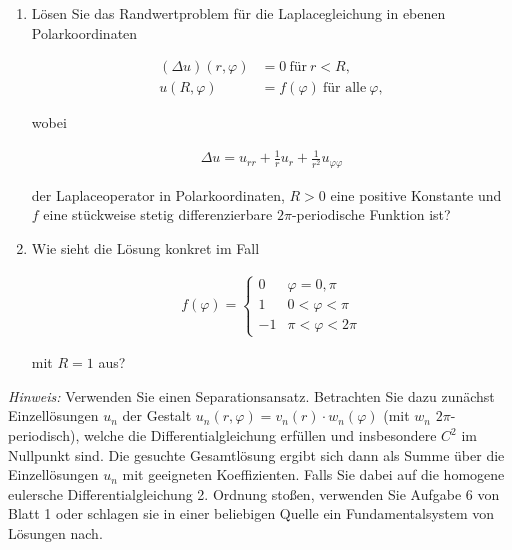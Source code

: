 
\begin{exercise}

\phantom{}

\begin{enumerate}[label = (\roman*)]

    \item Lösen Sie das Randwertproblem für die Laplacegleichung in ebenen Polarkoordinaten

    \begin{align*}
        (\Delta u)(r, \varphi)
        & =
        0 ~\text{für}~ r < R, \\
        u(R, \varphi)
        & =
        f(\varphi) ~\text{für alle}~ \varphi,
    \end{align*}

    wobei

    \begin{align*}
        \Delta u
        =
        u_{rr} + \frac{1}{r} u_r + \frac{1}{r^2} u_{\varphi \varphi}
    \end{align*}

    der Laplaceoperator in Polarkoordinaten, $R > 0$ eine positive Konstante und $f$ eine stückweise stetig differenzierbare $2 \pi$-periodische Funktion ist?

    \item Wie sieht die Lösung konkret im Fall

    \begin{align*}
        f(\varphi)
        =
        \begin{cases}
             0 & \varphi = 0, \pi \\
             1 & 0 < \varphi < \pi \\
            -1 & \pi < \varphi < 2 \pi
        \end{cases}
    \end{align*}

    mit $R = 1$ aus?

\end{enumerate}

\textit{Hinweis:}
Verwenden Sie einen Separationsansatz.
Betrachten Sie dazu zunächst Einzellösungen $u_n$ der Gestalt $u_n(r, \varphi) = v_n(r) \cdot w_n(\varphi)$ (mit $w_n$ $2 \pi$-periodisch), welche die Differentialgleichung erfüllen und insbesondere $C^2$ im Nullpunkt sind.
Die gesuchte Gesamtlösung ergibt sich dann als Summe über die Einzellösungen $u_n$ mit geeigneten Koeffizienten.
Falls Sie dabei auf die homogene eulersche Differentialgleichung 2. Ordnung stoßen, verwenden Sie Aufgabe 6 von Blatt 1 oder schlagen sie in einer beliebigen Quelle ein Fundamentalsystem von Lösungen nach.

\end{exercise}

